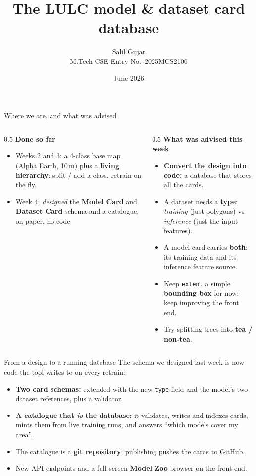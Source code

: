 \documentclass[aspectratio=169]{beamer}
\title[Model \& dataset card database]{The LULC model \& dataset card database}
\author[Salil Gujar]{Salil Gujar \\ \footnotesize M.Tech CSE \quad Entry No.\ 2025MCS2106}
\date{June 2026}
\begin{document}
\frame{\titlepage}

\begin{frame}{Where we are, and what was advised}
\begin{columns}[T]
\begin{column}{0.5\textwidth}
\textbf{Done so far}
\begin{itemize}\small
  \item Weeks 2 and 3: a 4-class base map (Alpha Earth, 10\,m) plus a \textbf{living hierarchy}:
  split / add a class, retrain on the fly.
  \item Week 4: \emph{designed} the \textbf{Model Card} and \textbf{Dataset Card} schema and a
  catalogue, on paper, no code.
\end{itemize}
\end{column}
\begin{column}{0.5\textwidth}
\textbf{What was advised this week}
\begin{itemize}\small
  \item \textbf{Convert the design into code:} a database that stores all the cards.
  \item A dataset needs a \textbf{type}: \emph{training} (just polygons) vs \emph{inference}
  (just the input features).
  \item A model card carries \textbf{both}: its training data and its inference feature source.
  \item Keep \texttt{extent} a simple \textbf{bounding box} for now; keep improving the front end.
  \item Try splitting trees into \textbf{tea / non-tea}.
\end{itemize}
\end{column}
\end{columns}
\end{frame}

\begin{frame}{From a design to a running database}
The schema we designed last week is now code the tool writes to on every retrain:
\begin{itemize}
  \item \textbf{Two card schemas:} extended with the new \texttt{type} field and the model's two
  dataset references, plus a validator.
  \item \textbf{A catalogue that \emph{is} the database:} it validates, writes and indexes cards,
  mints them from live training runs, and answers ``which models cover my area''.
  \item The catalogue is a \textbf{git repository}; publishing pushes the cards to GitHub.
  \item New API endpoints and a full-screen \textbf{Model Zoo} browser on the front end.
\end{itemize}
\end{frame}
\end{document}
